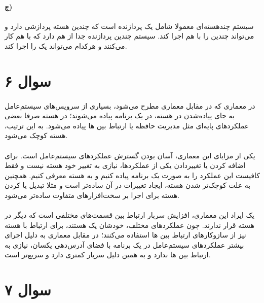 \documentclass{article}
\begin{document}
	\paragraph*{ج)}
	سیستم چندهسته‌ای معمولا شامل یک پردازنده است که چندین هسته پردازشی دارد و می‌تواند چندین
	 را با هم اجرا کند. سیستم
	چندین پردازنده جدا از هم دارد که با هم کار می‌کنند و هرکدام می‌تواند یک
	را اجرا کند.

	\section*{سوال ۶}
	\paragraph*{}
	در معماری
	که در مقابل معماری
	مطرح می‌شود، بسیاری از سرویس‌های سیستم‌عامل به جای پیاده‌شدن در هسته، در یک برنامه
	پیاده می‌شوند؛ در هسته صرفا بعضی عملکردهای پایه‌ای مثل مدیریت حافظه یا ارتباط بین
	ها
	پیاده می‌شود. به این ترتیب، هسته کوچک می‌شود.

	\paragraph*{}
	یکی از مزایای این معماری، آسان بودن گسترش عملکردهای سیستم‌عامل است. برای اضافه کردن یا تغییردادن یکی از عملکردها، نیازی به تغییر خود هسته نیست و فقط کافیست این عملکرد را به صورت یک برنامه
	پیاده کنیم و به هسته معرفی کنیم. همچنین به علت کوچک‌تر شدن هسته، ایجاد تغییرات در آن ساده‌تر است و مثلا تبدیل یا
	کردن هسته برای اجرا بر سخت‌افزارهای متفاوت ساده‌تر می‌شود.

	\paragraph*{}
	یک ایراد این معماری، افزایش سربار ارتباط بین قسمت‌های مختلفی است که دیگر در هسته قرار ندارند. چون عملکردهای مختلف، خودشان یک
	هستند، برای ارتباط با هسته نیز از سازوکارهای ارتباط بین
	ها
	استفاده می‌کنند؛ در مقابل معماری
	به دلیل اجرای بیشتر عملکردهای سیستم‌عامل در یک برنامه با فضای آدرس‌دهی یکسان، نیازی به ارتباط بین
	ها
	ندارد و به همین دلیل سربار کمتری دارد و سریع‌تر است.

	\section*{سوال ۷}
\end{document}
